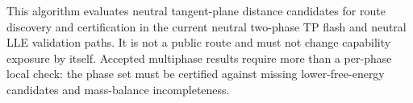 \documentclass[12pt, letterpaper]{article}
\begin{document}

This algorithm evaluates neutral tangent-plane distance candidates for route
discovery and certification in the current neutral two-phase TP flash and
neutral LLE validation paths. It is not a public route and must not change
capability exposure by itself. Accepted multiphase results require more than a
per-phase local check: the phase set must be certified against missing
lower-free-energy candidates and mass-balance incompleteness.

\end{document}
